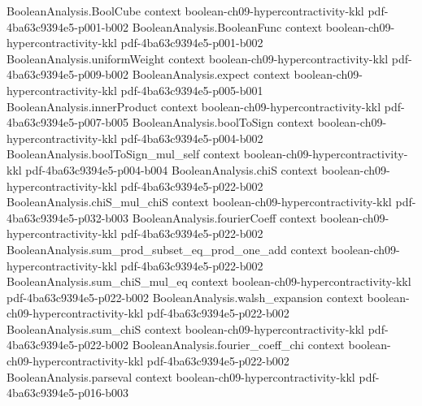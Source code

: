 \begin{theorem}
\label{BooleanAnalysis.Hypercontractivity.one_bit_2q_hypercontractivity}
\leanok
{}
\proofstep
  {BooleanAnalysis.BoolCube}
  {context}
  {boolean-ch09-hypercontractivity-kkl}
  {pdf-4ba63c9394e5-p001-b002}
\proofstep
  {BooleanAnalysis.BooleanFunc}
  {context}
  {boolean-ch09-hypercontractivity-kkl}
  {pdf-4ba63c9394e5-p001-b002}
\proofstep
  {BooleanAnalysis.uniformWeight}
  {context}
  {boolean-ch09-hypercontractivity-kkl}
  {pdf-4ba63c9394e5-p009-b002}
\proofstep
  {BooleanAnalysis.expect}
  {context}
  {boolean-ch09-hypercontractivity-kkl}
  {pdf-4ba63c9394e5-p005-b001}
\proofstep
  {BooleanAnalysis.innerProduct}
  {context}
  {boolean-ch09-hypercontractivity-kkl}
  {pdf-4ba63c9394e5-p007-b005}
\proofstep
  {BooleanAnalysis.boolToSign}
  {context}
  {boolean-ch09-hypercontractivity-kkl}
  {pdf-4ba63c9394e5-p004-b002}
\proofstep
  {BooleanAnalysis.boolToSign_mul_self}
  {context}
  {boolean-ch09-hypercontractivity-kkl}
  {pdf-4ba63c9394e5-p004-b004}
\proofstep
  {BooleanAnalysis.chiS}
  {context}
  {boolean-ch09-hypercontractivity-kkl}
  {pdf-4ba63c9394e5-p022-b002}
\proofstep
  {BooleanAnalysis.chiS_mul_chiS}
  {context}
  {boolean-ch09-hypercontractivity-kkl}
  {pdf-4ba63c9394e5-p032-b003}
\proofstep
  {BooleanAnalysis.fourierCoeff}
  {context}
  {boolean-ch09-hypercontractivity-kkl}
  {pdf-4ba63c9394e5-p022-b002}
\proofstep
  {BooleanAnalysis.sum_prod_subset_eq_prod_one_add}
  {context}
  {boolean-ch09-hypercontractivity-kkl}
  {pdf-4ba63c9394e5-p022-b002}
\proofstep
  {BooleanAnalysis.sum_chiS_mul_eq}
  {context}
  {boolean-ch09-hypercontractivity-kkl}
  {pdf-4ba63c9394e5-p022-b002}
\proofstep
  {BooleanAnalysis.walsh_expansion}
  {context}
  {boolean-ch09-hypercontractivity-kkl}
  {pdf-4ba63c9394e5-p022-b002}
\proofstep
  {BooleanAnalysis.sum_chiS}
  {context}
  {boolean-ch09-hypercontractivity-kkl}
  {pdf-4ba63c9394e5-p022-b002}
\proofstep
  {BooleanAnalysis.fourier_coeff_chi}
  {context}
  {boolean-ch09-hypercontractivity-kkl}
  {pdf-4ba63c9394e5-p022-b002}
\proofstep
  {BooleanAnalysis.parseval}
  {context}
  {boolean-ch09-hypercontractivity-kkl}
  {pdf-4ba63c9394e5-p016-b003}

\end{theorem}
